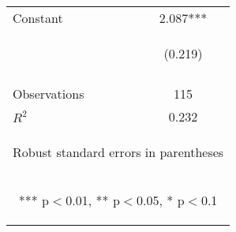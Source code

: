 \begin{center}
\begin{tabular}{lc}
Constant & 2.087*** \\
 & \begin{footnotesize}(0.219)\end{footnotesize} \\
\vspace{4pt} & \begin{footnotesize}\end{footnotesize} \\
Observations & 115 \\
 $R^2$ & 0.232 \\ \hline
\multicolumn{2}{c}{\begin{footnotesize} Robust standard errors in parentheses\end{footnotesize}} \\
\multicolumn{2}{c}{\begin{footnotesize} *** p$<$0.01, ** p$<$0.05, * p$<$0.1\end{footnotesize}} \\
\end{tabular}
\end{center}
